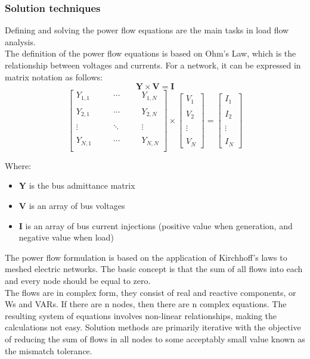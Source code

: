 \subsubsection{Solution techniques}
Defining and solving the power flow equations are the main tasks in load flow analysis. \\
The definition of the power flow equations is based on Ohm’s Law, which is the relationship between voltages and currents. For a network, it can be expressed in matrix notation as follows:
\[
    \mathbf{Y} \times \mathbf{V} = \mathbf{I}
\]
\[
 \begin{bmatrix}
 Y_{1,1} & \quad & \cdots & \quad & Y_{1,N} \\
 &  &  \\
 Y_{2,1} & \quad & \cdots & \quad & Y_{2,N} \\
 &  &  \\
 \vdots & \quad & \ddots & \quad & \vdots \\
 &  &  \\
 Y_{N,1} & \quad & \cdots & \quad & Y_{N,N} \\
 \end{bmatrix}
 \times
 \begin{bmatrix}
 V_1 \\ \\ V_2 \\ \\ \vdots \\ \\ V_N
 \end{bmatrix}
 =
 \begin{bmatrix}
 I_1 \\  \\ I_2 \\ \\ \vdots \\  \\ I_N
 \end{bmatrix}
\]

\noindent Where:
\begin{itemize}
    \item \textbf{Y} is the bus admittance matrix
    \item \textbf{V} is an array of bus voltages
    \item \textbf{I} is an array of bus current injections (positive value when generation, and negative value when load)
\end{itemize}

The power flow formulation is based on the application of Kirchhoff’s laws to meshed electric networks. The basic concept is that the sum of all flows into each and every node should be equal to zero.\\
The flows are in complex form, they consist of real and reactive components, or \glspl{W} and \glspl{VAR}. If there are n nodes, then there are n complex equations. The resulting system of equations involves non-linear relationships, making the calculations not easy. Solution methods are primarily iterative with the objective of reducing the sum of flows in all nodes to some acceptably small value known as the mismatch tolerance. \\

